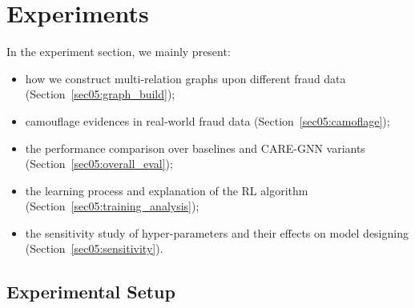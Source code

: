 \section{Experiments}
\label{sec05:exp}
In the experiment section, we mainly present:
\begin{itemize}\item how we construct multi-relation graphs upon different fraud data (Section~\ref{sec05:graph_build});
    
    \item camouflage evidences in real-world fraud data (Section~\ref{sec05:camoflage});
    
    \item the performance comparison over baselines and CARE-GNN variants (Section~\ref{sec05:overall_eval});
    
    \item the learning process and explanation of the RL algorithm (Section~\ref{sec05:training_analysis});
    
    \item the sensitivity study of hyper-parameters and their effects on model designing (Section~\ref{sec05:sensitivity}).
\end{itemize}



\subsection{Experimental Setup}
\label{sec05:setup}





